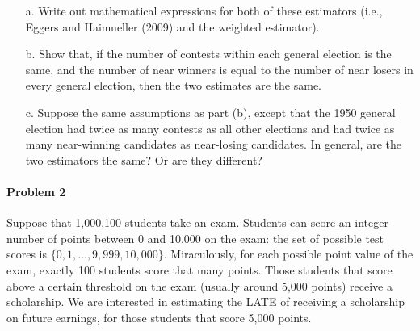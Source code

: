 \documentclass{article}
\begin{document}
   \begin{itemize}
     \item[a.]  Write out mathematical expressions for both of these
       estimators (i.e., Eggers and Haimueller (2009) and the weighted
       estimator).
     \item[b.]
       Show that, if the number of contests within each general election is the same, 
       and the number of near winners is equal to the 
       number of near losers in every general election, then
       the two estimates are the same.
     \item[c.]  Suppose the same assumptions as part (b), 
       except that the 1950 general election 
       had twice as many contests as all other elections
       and had twice as many near-winning candidates as near-losing candidates.       
       In general, are the two estimators the same?  Or are they different?
   \end{itemize}   



\paragraph{Problem 2}

   Suppose that 1,000,100 students take an exam.
   Students can score an integer number of points between 0 and 10,000 
   on the exam:
   the set of possible test scores is $\{0, 1, \ldots, 9,999, 10,000\}$.
   Miraculously, for each possible point value of the exam, 
   exactly 100 students score that many points.    
   Those students that score above a certain threshold on the exam
   (usually around 5,000 points) receive 
   a scholarship.
   We are interested in estimating the LATE of receiving a scholarship
   on future earnings, for those students that score 5,000 points.
   
\end{document}
